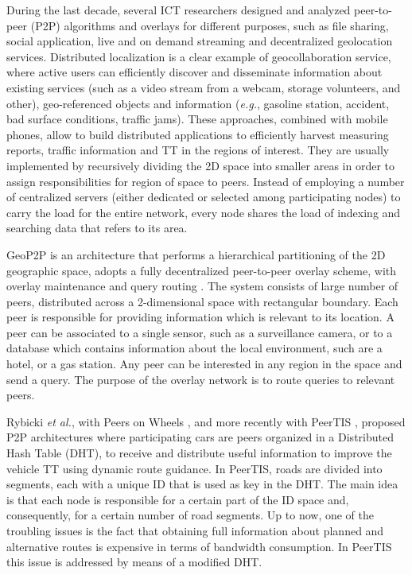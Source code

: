 \documentclass[10pt,onecolumn]{article}
\begin{document}
During the last decade, several ICT researchers designed and analyzed peer-to-peer (P2P) \cite{Amoretti2009} algorithms and overlays for different purposes, such as file sharing, social application, live and on demand streaming and decentralized geolocation services. Distributed localization is a clear example of geocollaboration service, where active users can efficiently discover and disseminate information about existing services (such as a video stream from a webcam, storage volunteers, and other), geo-referenced objects and information (\textit{e.g.}, gasoline station, accident, bad surface conditions, traffic jams). 
These approaches, combined with mobile phones, allow to build distributed applications to efficiently harvest measuring reports, traffic information and TT in the regions of interest. They are usually implemented by recursively dividing the 2D space into smaller areas in order to assign responsibilities for region of space to peers. Instead of employing a number of centralized servers (either dedicated  or  selected among participating nodes) to carry the load for the entire network, every node shares the load of indexing and searching data that refers to its area.  

GeoP2P is an architecture that performs a hierarchical partitioning of the 2D geographic space, adopts a fully decentralized peer-to-peer overlay scheme, with overlay maintenance and query routing \cite{geop2p}. The system consists of large number of peers, distributed across a 2-dimensional space with rectangular boundary.  Each peer is responsible for providing information which is relevant to its location. A peer can be associated to a single sensor, such as a surveillance camera, or to a database which contains information about the local environment, such are a hotel, or a gas station.
Any peer can be interested in any region in the space and send a query. The purpose of the overlay network is to route queries to relevant peers.

Rybicki \textit{et al.}, with Peers on Wheels \cite{Rybicki2007}, and more recently with PeerTIS \cite{Jedrzej2009}, proposed P2P architectures where participating cars are peers organized in a Distributed Hash Table (DHT), to receive and distribute useful information to improve the vehicle TT using dynamic route guidance. In PeerTIS, roads are divided into segments, each with a unique ID that is used as key in the DHT. The main idea is that each node is responsible for a certain part of the ID space and, consequently, for a certain number of road segments. Up to now, one of the troubling issues is the fact that obtaining full information about planned and alternative routes is expensive in terms of bandwidth consumption. In PeerTIS this issue is addressed by means of a modified DHT. 
\end{document}
